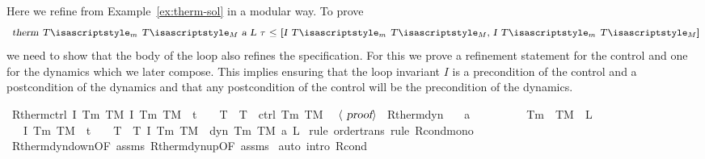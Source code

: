 \documentclass[envcountsame,envcountsect]{llncs}
\begin{document}
\begin{example}\label{ex:therm-rsol}
Here we refine  from Example~\ref{ex:therm-sol} in a modular way. To prove 
\begin{equation*}
\isa{therm\ T\isactrlsub m\ T\isactrlsub M\ a\ L\ {\isasymtau}\ {\isasymle}\ \isactrlbold {\isacharbrackleft}I\ T\isactrlsub m\ T\isactrlsub M{\isacharcomma}\ I\ T\isactrlsub m\ T\isactrlsub M\isactrlbold {\isacharbrackright}}
\end{equation*} 
we need to show that the body of the loop also refines the specification. For this we prove a refinement statement for the control and one for the dynamics which we later compose. This implies ensuring that the loop invariant $I$ is a precondition of the control and a postcondition of the dynamics and that any postcondition of the control will be the precondition of the dynamics.
\begin{isabellebody}
\isanewline
{}\isamarkupfalse%
\ R{\isacharunderscore}therm{\isacharunderscore}ctrl{\isacharcolon}\ {\isachardoublequoteopen}\isactrlbold {\isacharbrackleft}I\ T\isactrlsub m\ T\isactrlsub M{\isacharcomma}\ I\ T\isactrlsub m\ T\isactrlsub M\ {\isasymand}\ t\ {\isacharequal}\ {}\ {\isasymand}\ T\ {\isacharequal}\ T\isactrlbold {\isacharbrackright}\ {\isasymge}\ ctrl\ T\isactrlsub m\ T\isactrlsub M{\isachardoublequoteclose}\isanewline
\ \ $\langle \isa{proof}\rangle$\isanewline
\isanewline
{}\isamarkupfalse%
\ R{\isacharunderscore}therm{\isacharunderscore}dyn{\isacharcolon}\isanewline
\ \ \ {\isachardoublequoteopen}a\ {\isachargreater}\ {}{\isachardoublequoteclose}\ \ {\isachardoublequoteopen}{}\ {\isasymle}\ {\isasymtau}{\isachardoublequoteclose}\ \ {\isachardoublequoteopen}{}\ {\isacharless}\ T\isactrlsub m{\isachardoublequoteclose}\ \ {\isachardoublequoteopen}T\isactrlsub M\ {\isacharless}\ L{\isachardoublequoteclose}\isanewline
\ \ \ {\isachardoublequoteopen}\isactrlbold {\isacharbrackleft}I\ T\isactrlsub m\ T\isactrlsub M\ {\isasymand}\ t\ {\isacharequal}\ {}\ {\isasymand}\ T\ {\isacharequal}\ T{\isacharcomma}\ I\ T\isactrlsub m\ T\isactrlsub M\isactrlbold {\isacharbrackright}\ {\isasymge}\ dyn\ T\isactrlsub m\ T\isactrlsub M\ a\ L\ {\isasymtau}{\isachardoublequoteclose}\isanewline
{}\isamarkupfalse%
{\isacharparenleft}rule\ order{\isacharunderscore}trans{\isacharcomma}\ rule\ R{\isacharunderscore}cond{\isacharunderscore}mono{\isacharparenright}\isanewline
\ \ \isamarkupfalse%
\ R{\isacharunderscore}therm{\isacharunderscore}dyn{\isacharunderscore}down{\isacharbrackleft}OF\ assms{\isacharbrackright}\ R{\isacharunderscore}therm{\isacharunderscore}dyn{\isacharunderscore}up{\isacharbrackleft}OF\ assms{\isacharbrackright}\isanewline 
{}\isamarkupfalse%
\ {\isacharparenleft}auto\ intro{\isacharbang}{\isacharcolon}\ R{\isacharunderscore}cond{\isacharparenright}\isanewline
\end{isabellebody}


\end{example}
\end{document}
